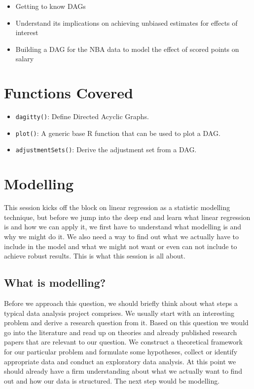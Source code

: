 \documentclass[
]{book}
\providecommand{\tightlist}{%
  \setlength{\itemsep}{0pt}\setlength{\parskip}{0pt}}
\begin{document}
\begin{itemize}
\tightlist
\item
  Getting to know DAGs
\item
  Understand its implications on achieving unbiased estimates for
  effects of interest
\item
  Building a DAG for the NBA data to model the effect of scored points
  on salary
\end{itemize}

\hypertarget{functions-covered}{%
\section{Functions Covered}\label{functions-covered}}

\begin{itemize}
\tightlist
\item
  \texttt{dagitty()}: Define Directed Acyclic Graphs.
\item
  \texttt{plot()}: A generic base R function that can be used to plot a DAG.
\item
  \texttt{adjustmentSets()}: Derive the adjustment set from a DAG.
\end{itemize}

\hypertarget{modelling}{%
\section{Modelling}\label{modelling}}

This session kicks off the block on linear regression as a statistic
modelling technique, but before we jump into the deep end and learn what
linear regression is and how we can apply it, we first have to
understand what modelling is and why we might do it. We also need a way
to find out what we actually have to include in the model and what we
might not want or even can not include to achieve robust results. This
is what this session is all about.

\hypertarget{what-is-modelling}{%
\subsection{What is modelling?}\label{what-is-modelling}}

Before we approach this question, we should briefly think about what
steps a typical data analysis project comprises. We usually start with
an interesting problem and derive a research question from it. Based on
this question we would go into the literature and read up on theories
and already published research papers that are relevant to our question.
We construct a theoretical framework for our particular problem and
formulate some hypotheses, collect or identify appropriate data and
conduct an exploratory data analysis. At this point we should already
have a firm understanding about what we actually want to find out and
how our data is structured. The next step would be modelling.
\end{document}
